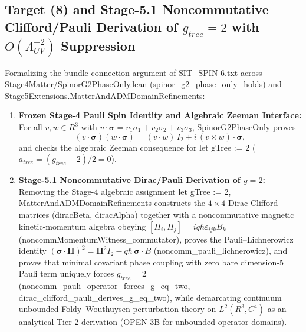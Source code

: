 \documentclass[american,11pt,letterpaper]{article}
\def\mathbb#1{#1}%
\def\mathbf#1{#1}%
\def\mathrm#1{#1}%
\def\texttt#1{#1}%
\begin{document}
\subsection{Target (8) and Stage-5.1 Noncommutative Clifford/Pauli Derivation of $g_{\mathrm{tree}} = 2$ with $O(\Lambda_{\mathrm{UV}}^{-2})$ Suppression}

Formalizing the bundle-connection argument of \texttt{SIT\_SPIN 6.txt} across \texttt{Stage4\allowbreak{}Matter/Spinor\allowbreak{}G2\allowbreak{}Phase\allowbreak{}Only.\allowbreak{}lean} (\texttt{spinor\_\allowbreak{}g2\_\allowbreak{}phase\_\allowbreak{}only\_\allowbreak{}holds}) and \texttt{Stage5\allowbreak{}Extensions.\allowbreak{}Matter\allowbreak{}And\allowbreak{}ADMDomain\allowbreak{}Refinements}:
\begin{enumerate}[leftmargin=2em]
  \item \textbf{Frozen Stage-4 Pauli Spin Identity and Algebraic Zeeman Interface:} For all $\mathbf{v}, \mathbf{w} \in \mathbb{R}^3$ with $\mathbf{v}\cdot\boldsymbol{\sigma} = v_1\sigma_1 + v_2\sigma_2 + v_3\sigma_3$, \texttt{SpinorG2PhaseOnly} proves
  \begin{equation}
  (\mathbf{v}\cdot\boldsymbol{\sigma})(\mathbf{w}\cdot\boldsymbol{\sigma})
  = (\mathbf{v}\cdot\mathbf{w})\,I_2 + i\,(\mathbf{v}\times\mathbf{w})\cdot\boldsymbol{\sigma},
  \label{eq:pauli_product_identity}
  \end{equation}
  and checks the algebraic Zeeman consequence for \texttt{let gTree := 2} ($a_{\mathrm{tree}} = (g_{\mathrm{tree}}-2)/2 = 0$).
  \item \textbf{Stage-5.1 Noncommutative Dirac/Pauli Derivation of $g = 2$:} Removing the Stage-4 algebraic assignment \texttt{let gTree := 2}, \texttt{Matter\allowbreak{}And\allowbreak{}ADMDomain\allowbreak{}Refinements} constructs the $4\times 4$ Dirac Clifford matrices (\texttt{diracBeta}, \texttt{diracAlpha}) together with a noncommutative magnetic kinetic-momentum algebra obeying $[\Pi_i, \Pi_j] = i q\hbar\varepsilon_{ijk}B_k$ (\texttt{noncomm\allowbreak{}Momentum\allowbreak{}Witness\_\allowbreak{}commutator}), proves the Pauli--Lichnerowicz identity $(\boldsymbol{\sigma}\cdot\boldsymbol{\Pi})^2 = \boldsymbol{\Pi}^2 I_2 - q\hbar\,\boldsymbol{\sigma}\cdot\mathbf{B}$ (\texttt{noncomm\_\allowbreak{}pauli\_\allowbreak{}lichnerowicz}), and proves that minimal covariant phase coupling with zero bare dimension-5 Pauli term uniquely forces $g_{\mathrm{tree}} = 2$ (\texttt{noncomm\_\allowbreak{}pauli\_\allowbreak{}operator\_\allowbreak{}forces\_\allowbreak{}g\_\allowbreak{}eq\_\allowbreak{}two}, \texttt{dirac\_\allowbreak{}clifford\_\allowbreak{}pauli\_\allowbreak{}derives\_\allowbreak{}g\_\allowbreak{}eq\_\allowbreak{}two}), while demarcating continuum unbounded Foldy--Wouthuysen perturbation theory on $L^2(\mathbb{R}^3,\mathbb{C}^4)$ as an analytical Tier-2 derivation (\texttt{OPEN-3B} for unbounded operator domains).

\end{enumerate}
\end{document}
